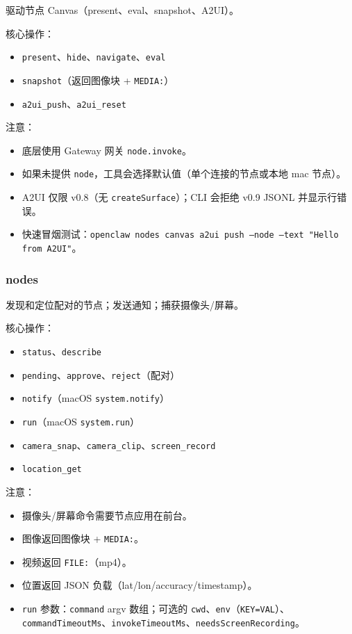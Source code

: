 驱动节点 Canvas（present、eval、snapshot、A2UI）。

核心操作：

\begin{itemize}
  \item \texttt{present}、\texttt{hide}、\texttt{navigate}、\texttt{eval}
  \item \texttt{snapshot}（返回图像块 + \texttt{MEDIA:}）
  \item \texttt{a2ui\_push}、\texttt{a2ui\_reset}
\end{itemize}


注意：

\begin{itemize}
  \item 底层使用 Gateway 网关 \texttt{node.invoke}。
  \item 如果未提供 \texttt{node}，工具会选择默认值（单个连接的节点或本地 mac 节点）。
  \item A2UI 仅限 v0.8（无 \texttt{createSurface}）；CLI 会拒绝 v0.9 JSONL 并显示行错误。
  \item 快速冒烟测试：\texttt{openclaw nodes canvas a2ui push --node  --text "Hello from A2UI"}。
\end{itemize}


\subsubsection{nodes}


发现和定位配对的节点；发送通知；捕获摄像头/屏幕。

核心操作：

\begin{itemize}
  \item \texttt{status}、\texttt{describe}
  \item \texttt{pending}、\texttt{approve}、\texttt{reject}（配对）
  \item \texttt{notify}（macOS \texttt{system.notify}）
  \item \texttt{run}（macOS \texttt{system.run}）
  \item \texttt{camera\_snap}、\texttt{camera\_clip}、\texttt{screen\_record}
  \item \texttt{location\_get}
\end{itemize}


注意：

\begin{itemize}
  \item 摄像头/屏幕命令需要节点应用在前台。
  \item 图像返回图像块 + \texttt{MEDIA:}。
  \item 视频返回 \texttt{FILE:}（mp4）。
  \item 位置返回 JSON 负载（lat/lon/accuracy/timestamp）。
  \item \texttt{run} 参数：\texttt{command} argv 数组；可选的 \texttt{cwd}、\texttt{env}（\texttt{KEY=VAL}）、\texttt{commandTimeoutMs}、\texttt{invokeTimeoutMs}、\texttt{needsScreenRecording}。
\end{itemize}


